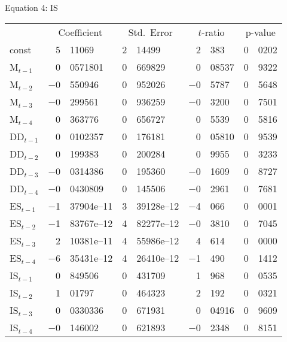 \documentclass[11pt]{article}
\begin{document}
\begin{center}

Equation 4: IS\\

\vspace{1em}

\begin{tabular}{lr@{.}lr@{.}lr@{.}lr@{.}l}
  &
 \multicolumn{2}{c}{Coefficient} &
  \multicolumn{2}{c}{Std.\ Error} &
   \multicolumn{2}{c}{$t$-ratio} &
    \multicolumn{2}{c}{p-value} \\[1ex]
const &
  5&11069 &
    2&14499 &
      2&383 &
        0&0202 \\
M$_{t-1}$ &
  0&0571801 &
    0&669829 &
      0&08537 &
        0&9322 \\
M$_{t-2}$ &
  $-$0&550946 &
    0&952026 &
      $-$0&5787 &
        0&5648 \\
M$_{t-3}$ &
  $-$0&299561 &
    0&936259 &
      $-$0&3200 &
        0&7501 \\
M$_{t-4}$ &
  0&363776 &
    0&656727 &
      0&5539 &
        0&5816 \\
DD$_{t-1}$ &
  0&0102357 &
    0&176181 &
      0&05810 &
        0&9539 \\
DD$_{t-2}$ &
  0&199383 &
    0&200284 &
      0&9955 &
        0&3233 \\
DD$_{t-3}$ &
  $-$0&0314386 &
    0&195360 &
      $-$0&1609 &
        0&8727 \\
DD$_{t-4}$ &
  $-$0&0430809 &
    0&145506 &
      $-$0&2961 &
        0&7681 \\
ES$_{t-1}$ &
  $-$1&37904\textrm{e--11} &
    3&39128\textrm{e--12} &
      $-$4&066 &
        0&0001 \\
ES$_{t-2}$ &
  $-$1&83767\textrm{e--12} &
    4&82277\textrm{e--12} &
      $-$0&3810 &
        0&7045 \\
ES$_{t-3}$ &
  2&10381\textrm{e--11} &
    4&55986\textrm{e--12} &
      4&614 &
        0&0000 \\
ES$_{t-4}$ &
  $-$6&35431\textrm{e--12} &
    4&26410\textrm{e--12} &
      $-$1&490 &
        0&1412 \\
IS$_{t-1}$ &
  0&849506 &
    0&431709 &
      1&968 &
        0&0535 \\
IS$_{t-2}$ &
  1&01797 &
    0&464323 &
      2&192 &
        0&0321 \\
IS$_{t-3}$ &
  0&0330336 &
    0&671931 &
      0&04916 &
        0&9609 \\
IS$_{t-4}$ &
  $-$0&146002 &
    0&621893 &
      $-$0&2348 &
        0&8151 \\
\end{tabular}


\end{center}
\end{document}
